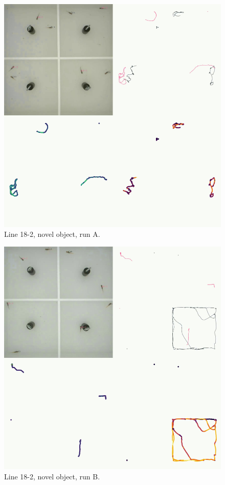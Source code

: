 \documentclass[
]{book}
\begin{document}
\begin{figure}
\includegraphics[width=1\linewidth]{figs/mikk_behaviour/four_panel_plots/novel_object_20191112_1236_18-2_L_A_300} \caption{Line 18-2, novel object, run A.}\label{fig:4p-18-2-no-A}
\end{figure}



\begin{figure}
\includegraphics[width=1\linewidth]{figs/mikk_behaviour/four_panel_plots/novel_object_20191116_1039_18-2_L_B_300} \caption{Line 18-2, novel object, run B.}\label{fig:4p-18-2-no-B}
\end{figure}
\end{document}
